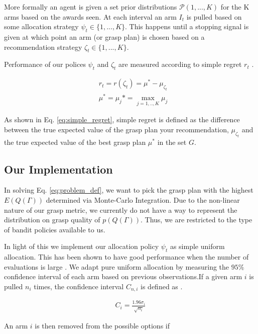 \documentclass[letterpaper, 10 pt, conference]{ieeeconf}  %
\begin{document}
More formally an agent is given a set prior distributions $\mathcal{P}(1,...,K)$ for the K arms based on the awards seen. At each interval an arm $I_t$ is pulled based on some allocation strategy $\psi_t \in \lbrace 1,...,K \rbrace$. This happens until a stopping signal is given at which point an arm (or grasp plan) is chosen based on a recommendation strategy $\zeta_t \in \lbrace 1,...,K \rbrace$. 

Performance of our polices $\psi_t$ and $\zeta_t$ are measured according to simple regret $r_t$ \cite{bubeck2009pure}. 

\vspace{-2ex}
\begin{align}\label{eq:simple_regret}
&r_t = r(\zeta_t) = \mu^* - \mu_{\zeta_t} \\
&\mu^* = \mu_j* = \max_{j=1,..,K} \mu_j
\end{align}

As shown in Eq. \ref{eq:simple_regret}, simple regret is defined as the difference between the true expected value of the grasp plan your recommendation, $\mu_{\zeta_t}$ and the true expected value of the best grasp plan $\mu^*$ in the set $G$. 

\subsection{Our Implementation}
In solving Eq. \ref{eq:problem_def}, we want to pick the grasp plan with the highest $E(Q(\Gamma))$ determined via Monte-Carlo Integration. Due to the non-linear nature of our grasp metric, we currently do not have a way to represent the distribution on grasp quality of $p(Q(\Gamma))$. Thus, we are restricted to the type of bandit policies available to us.

In light of this we implement our allocation policy $\psi_t$ as simple uniform allocation. This has been shown to have good performance when the number of evaluations is large \cite{bubeck2009pure}. We adapt pure uniform allocation by measuring the $95\%$ confidence interval of each arm based on previous observations.If a given arm $i$ is pulled $n_i$ times, the confidence interval $C_{n, i}$ is defined as \cite{caflisch1998monte}.

\vspace{-2ex}
\begin{align}
C_{ i} = \frac{1.96 \sigma_i}{\sqrt{n_i}}
\end{align}


An arm $i$ is then removed from the possible options if 
\end{document}
